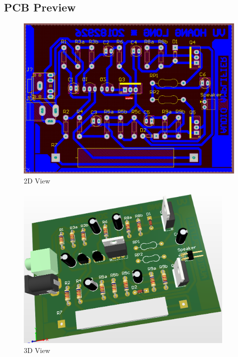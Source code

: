 \documentclass[twoside, a4paper, leqno]{article}
\begin{document}
		\subsection{PCB Preview}
		\begin{center}
			\begin{figure}[htp]
				\begin{center}
					\includegraphics[height=8cm]{figure/PCB_layout.png}
				\end{center}
				\caption{2D View}
				\label{refFigure12}
			\end{figure}
			\begin{figure}[htp]
				\begin{center}
					\includegraphics[height=8cm]{figure/PCB_preview.png}
				\end{center}
				\caption{3D View}
				\label{refFigure13}
			\end{figure}
		\end{center}
	
	    \newpage
\end{document}
